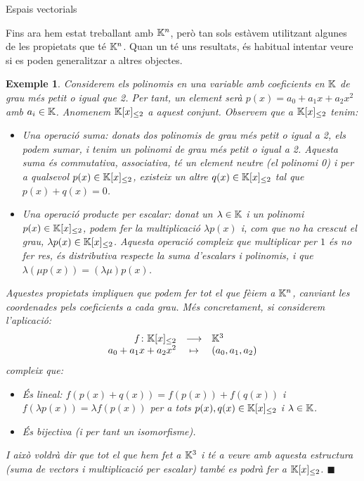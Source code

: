 \documentclass[
  11pt,
]{book}
\makeatletter
\numberwithin{dummy}{section}
\theoremstyle{maincolornumbox}
\theoremstyle{blacknumex}
\newtheorem{exampleT}{Exemple}[chapter]
\theoremstyle{blacknumbox}
\theoremstyle{maincolornum}
\newenvironment{example}{\begin{exampleT}}{\hfill{\tiny\ensuremath{\blacksquare}}\end{exampleT}}
\renewcommand{\section}{\@startsection{section}{1}{\z@}
{-4ex \@plus -1ex \@minus -.4ex}
{1ex \@plus.2ex }
{\normalfont\large\sffamily\bfseries}}
\newlength\esp
\makeatother
\begin{document}
\section{Espais vectorials}\label{espais-vectorials}

Fins ara hem estat treballant amb \(\mathbb{K}^n\), però tan sols estàvem
utilitzant algunes de les propietats que té \(\mathbb{K}^n\). Quan un té uns
resultats, és habitual intentar veure si es poden generalitzar a altres
objectes.

\begin{example}
Considerem els polinomis en una variable amb coeficients en \(\mathbb{K}\) de grau
més petit o igual que 2. Per tant, un element serà
\(p(x)=a_0+a_1x+a_2x^2\) amb \(a_i\in \mathbb{K}\). Anomenem \(\mathbb{K}[x]_{\leq2}\) a
aquest conjunt. Observem que a \(\mathbb{K}[x]_{\leq2}\) tenim:

\begin{itemize}
\item
  Una operació suma: donats dos polinomis de grau més petit o igual a
  2, els podem sumar, i tenim un polinomi de grau més petit o igual
  a 2. Aquesta suma és commutativa, associativa, té un element neutre
  (el polinomi 0) i per a qualsevol \(p(x)\in\mathbb{K}[x]_{\leq2}\), existeix
  un altre \(q(x)\in\mathbb{K}[x]_{\leq2}\) tal que \(p(x)+q(x)=0\).
\item
  Una operació producte per escalar: donat un \(\lambda \in \mathbb{K}\) i un
  polinomi \(p(x)\in\mathbb{K}[x]_{\leq2}\), podem fer la multiplicació
  \(\lambda p(x)\) i, com que no ha crescut el grau,
  \(\lambda p(x)\in\mathbb{K}[x]_{\leq2}\). Aquesta operació compleix que
  multiplicar per \(1\) és no fer res, és distributiva respecte la suma
  d'escalars i polinomis, i que \(\lambda(\mu p(x))=(\lambda\mu)p(x)\).
\end{itemize}

Aquestes propietats impliquen que podem fer tot el que fèiem a \(\mathbb{K}^n\),
canviant les coordenades pels coeficients a cada grau. Més concretament,
si considerem l'aplicació: \[\begin{array}{rcl}
 f\colon \mathbb{K}[x]_{\leq2} & \longrightarrow & \mathbb{K}^3 \\
     a_0+a_1x+a_2x^2 & \mapsto & (a_0,a_1,a_2)
    \end{array}\] compleix que:

\begin{itemize}
\item
  És lineal: \(f(p(x)+q(x))=f(p(x))+f(q(x))\) i
  \(f(\lambda p(x))=\lambda f(p(x))\) per a tots
  \(p(x),q(x)\in \mathbb{K}[x]_{\leq2}\) i \(\lambda \in \mathbb{K}\).
\item
  És bijectiva (i per tant un isomorfisme).
\end{itemize}

I això voldrà dir que tot el que hem fet a \(\mathbb{K}^3\) i té a veure amb
aquesta estructura (suma de vectors i multiplicació per escalar) també
es podrà fer a \(\mathbb{K}[x]_{\leq2}\).
\end{example}
\end{document}
